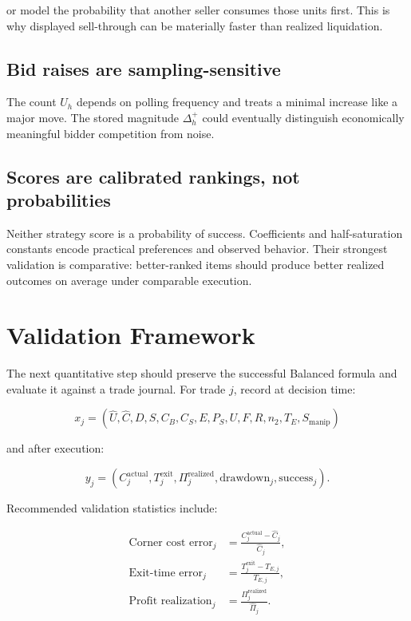 \documentclass[11pt,a4paper]{article}
\begin{document}
or model the probability that another seller consumes those units first. This is why displayed
sell-through can be materially faster than realized liquidation.

\subsection{Bid raises are sampling-sensitive}

The count $U_h$ depends on polling frequency and treats a minimal increase like a major move.
The stored magnitude $\Delta_h^+$ could eventually distinguish economically meaningful bidder
competition from noise.

\subsection{Scores are calibrated rankings, not probabilities}

Neither strategy score is a probability of success. Coefficients and half-saturation constants
encode practical preferences and observed behavior. Their strongest validation is comparative:
better-ranked items should produce better realized outcomes on average under comparable execution.

\section{Validation Framework}

The next quantitative step should preserve the successful Balanced formula and evaluate it
against a trade journal. For trade $j$, record at decision time:

\begin{equation*}
x_j=(\widehat U,\widehat C,D,S,C_B,C_S,E,P_S,U,F,R,n_2,T_E,S_{\mathrm{manip}})
\end{equation*}

and after execution:

\begin{equation*}
y_j=(C_j^{\mathrm{actual}},T_j^{\mathrm{exit}},\Pi_j^{\mathrm{realized}},
\mathrm{drawdown}_j,\mathrm{success}_j).
\end{equation*}

Recommended validation statistics include:

\begin{align}
\text{Corner cost error}_j&=\frac{C_j^{\mathrm{actual}}-\widehat C_j}{\widehat C_j},\\
\text{Exit-time error}_j&=\frac{T_j^{\mathrm{exit}}-T_{E,j}}{T_{E,j}},\\
\text{Profit realization}_j&=\frac{\Pi_j^{\mathrm{realized}}}{\widehat\Pi_j}.
\end{align}
\end{document}
